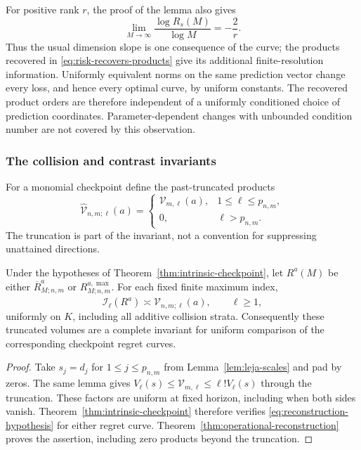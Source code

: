 For positive rank $r$, the proof of the lemma also gives
\[
 \lim_{M\to\infty}\frac{\log R_s(M)}{\log M}=-\frac2r.
\]
Thus the usual dimension slope is one consequence of the curve; the
products recovered in \eqref{eq:risk-recovers-products} give its
additional finite-resolution information. Uniformly equivalent norms
on the same prediction vector change every loss, and hence every
optimal curve, by uniform constants. The recovered product orders are
therefore independent of a uniformly conditioned choice of prediction
coordinates. Parameter-dependent changes with unbounded condition
number are not covered by this observation.

\subsubsection{The collision and contrast invariants}
For a monomial checkpoint define the past-truncated products
\[
 \widehat{\mathcal V}_{n,m;\ell}(a)=
 \begin{cases}
  \mathcal V_{m,\ell}(a),&1\le\ell\le p_{n,m},\\
  0,&\ell>p_{n,m}.
 \end{cases}
\]
The truncation is part of the invariant, not a convention for suppressing
unattained directions.

\begin{corollary}
\label{cor:monomial-operational-recovery}
Under the hypotheses of Theorem~\ref{thm:intrinsic-checkpoint}, let
$R^a(M)$ be either $\overline R^a_{M;n,m}$ or
$R^{a,\max}_{M;n,m}$. For each fixed finite maximum index,
\begin{equation}\label{eq:monomial-operational-recovery}
 \mathcal I_\ell(R^a)\asymp
       \widehat{\mathcal V}_{n,m;\ell}(a),\qquad \ell\ge1,
\end{equation}
uniformly on $K$, including all additive collision strata. Consequently
these truncated volumes are a complete invariant for uniform comparison
of the corresponding checkpoint regret curves.
\end{corollary}
\begin{proof}
Take $s_j=d_j$ for $1\le j\le p_{n,m}$ from
Lemma~\ref{lem:leja-scales} and pad by zeros. The same lemma gives
$V_\ell(s)\le\mathcal V_{m,\ell}\le\ell!V_\ell(s)$ through the
truncation. These factors are uniform at fixed horizon, including when
both sides vanish. Theorem~\ref{thm:intrinsic-checkpoint} therefore
verifies \eqref{eq:reconstruction-hypothesis} for either regret curve.
Theorem~\ref{thm:operational-reconstruction} proves the assertion,
including zero products beyond the truncation.
\end{proof}

